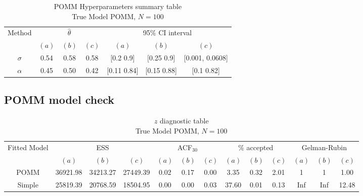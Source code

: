 \documentclass[11pt]{amsart}
\begin{document}
\begin{table}[htbp]
\centering
\caption*{
{\large POMM Hyperparameters summary table} \\ 
{\small True Model POMM, $N=100$}
} 
\begin{tabular}{ccccccc}
\toprule
\multirow{2}{*}{Method} & \multicolumn{3}{c}{
$\hat{\theta}$} & \multicolumn{3}{c}{
95$\%$ CI interval}  \\
\cmidrule(lr){2-4} \cmidrule(lr){5-7} 
& $(a)$ & $(b)$ & $(c)$ & $(a)$ & $(b)$ & $(c)$  \\
\midrule
$\sigma$  &0.54 & 0.58 & 0.58 & [0.2	0.9] & [0.25	0.9] & [0.001,	0.0608]   \\
$\alpha$ & 0.45& 0.50& 0.42 & [0.11	0.84] & [0.15	0.88] & [0.1	0.82] \\
\bottomrule
\end{tabular}
\label{table:simulations_from_simple}
\end{table}


\subsection{POMM model check}



\begin{table}[htbp]
\centering
\caption*{
{\large $z$ diagnostic table} \\ 
{\small True Model POMM, $N=100$}
} 
\begin{tabular}{ccccccccccccc}
\toprule
\multirow{2}{*}{Fitted Model} & \multicolumn{3}{c}{ESS} & \multicolumn{3}{c}{
ACF$_{30}$} & \multicolumn{3}{c}{$\%$ accepted} & \multicolumn{3}{c}{Gelman-Rubin}\\
\cmidrule(lr){2-4} \cmidrule(lr){5-7} \cmidrule(lr){8-10} \cmidrule(lr){11-13} 
& $(a)$ & $(b)$ & $(c)$ & $(a)$ & $(b)$ & $(c)$ & $(a)$ & $(b)$ & $(c)$ & $(a)$ & $(b)$ & $(c)$ \\
\midrule
POMM &36921.98 & 34213.27 & 27449.39 & 0.02 & 0.17 & 0.00 & 3.35 & 0.32 & 2.01 & 1 & 1 & 1.00  \\
Simple &25819.39 & 20768.59 & 18504.95 & 0.00 & 0.00 & 0.03 & 37.60 & 0.01 & 0.13 & Inf & Inf & 12.48    \\
\bottomrule
\end{tabular}
\label{table:simulations_from_simple}
\end{table}
\end{document}
